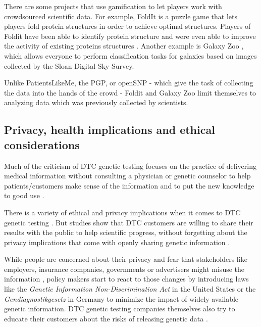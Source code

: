 \documentclass[10pt]{article}
\begin{document}
There are some projects that use gamification to let players work with crowdsourced scientific data. For example, FoldIt is a puzzle game that lets players fold protein structures in order to achieve optimal structures. Players of Foldit have been able to identify protein structure and were even able to improve the activity of existing proteins structures \cite{Eiben2012}. Another example is Galaxy Zoo \cite{GalaxyZoo}, which allows everyone to perform classification tasks for galaxies based on images collected by the Sloan Digital Sky Survey. 

Unlike PatientsLikeMe, the PGP, or openSNP - which give the task of collecting the data into the hands of the crowd - Foldit and Galaxy Zoo limit themselves to analyzing data which was previously collected by scientists.  

\subsection*{Privacy, health implications and ethical considerations}

Much of the criticism of DTC genetic testing focuses on the practice 
of delivering medical information without consulting a physician or genetic counselor to help patients/customers make sense of the information and to put the new knowledge to good use \cite{Hauskeller2011,Hogarth2008,Wasson2009}.  

There is a variety of ethical and privacy implications when it comes to DTC genetic testing \cite{Caulfield2011,Joh2011}. But studies show that DTC customers are willing to share their results with the public to help scientific progress, without forgetting about the privacy implications that come with openly sharing genetic information \cite{Darst2013}. 

While people are concerned about their privacy and fear that stakeholders like employers, insurance companies, governments or advertisers might misuse the information \cite{Wolinsky2005}, policy makers start to react to those changes by introducing laws like the 
\textit{Genetic Information Non-Discrimination Act} in the United States or the \emph{Gendiagnostikgesetz} in Germany to minimize the impact of
widely available genetic information. DTC genetic testing companies themselves also try to educate their customers about the risks of releasing genetic data \cite{Lee2009}. 
\end{document}
